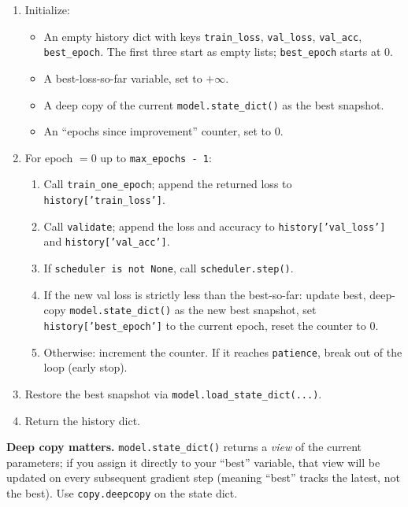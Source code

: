\documentclass[11pt]{article}
\newcommand{\code}[1]{\texttt{\small #1}}
\begin{document}
\begin{enumerate}
    \item Initialize:
    \begin{itemize}
        \item An empty history dict with keys \code{train\_loss},
              \code{val\_loss}, \code{val\_acc}, \code{best\_epoch}. The
              first three start as empty lists; \code{best\_epoch} starts
              at $0$.
        \item A best-loss-so-far variable, set to $+\infty$.
        \item A deep copy of the current \code{model.state\_dict()} as the
              best snapshot.
        \item An ``epochs since improvement'' counter, set to $0$.
    \end{itemize}
    \item For epoch $= 0$ up to \code{max\_epochs - 1}:
    \begin{enumerate}
        \item Call \code{train\_one\_epoch}; append the returned loss to
              \code{history['train\_loss']}.
        \item Call \code{validate}; append the loss and accuracy to
              \code{history['val\_loss']} and \code{history['val\_acc']}.
        \item If \code{scheduler is not None}, call \code{scheduler.step()}.
        \item If the new val loss is strictly less than the best-so-far:
              update best, deep-copy \code{model.state\_dict()} as the new
              best snapshot, set \code{history['best\_epoch']} to the
              current epoch, reset the counter to $0$.
        \item Otherwise: increment the counter. If it reaches
              \code{patience}, break out of the loop (early stop).
    \end{enumerate}
    \item Restore the best snapshot via \code{model.load\_state\_dict(...)}.
    \item Return the history dict.
\end{enumerate}

\medskip\noindent
\textbf{Deep copy matters.} \code{model.state\_dict()} returns a \emph{view}
of the current parameters; if you assign it directly to your ``best''
variable, that view will be updated on every subsequent gradient step
(meaning ``best'' tracks the latest, not the best). Use \code{copy.deepcopy}
on the state dict.
\end{document}
